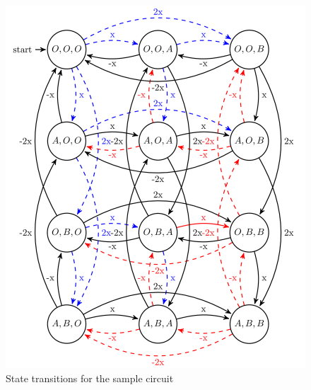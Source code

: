 \begin{figure} 
	\centering
	\includegraphics[width=1\linewidth]{tikz/sys}
	\caption[State transitions for the sample circuit]{State transitions for the sample circuit}
	\label{fig:sys}
	\vspace*{-3ex}
\end{figure}
